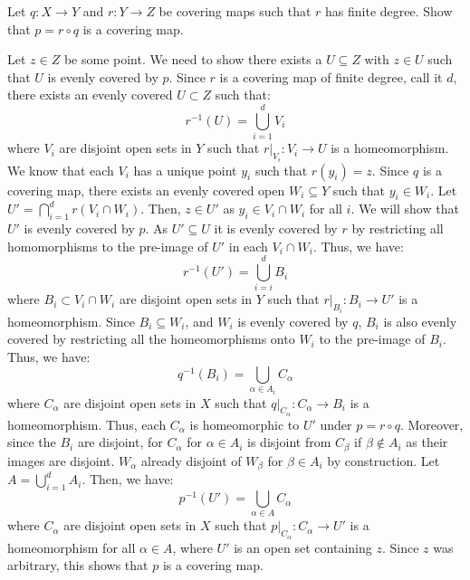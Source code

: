 \documentclass[12pt]{article}
\begin{document}
\begin{problem}{6}
Let \( q : X \to Y \) and \( r : Y \to Z \) be covering maps such that \( r \) has finite degree. Show that \( p = r \circ q \) is a covering map.
\end{problem}
\begin{solution}
    Let $z \in Z$ be some point. We need to show there exists a $U \subseteq Z$ with $z \in U$ such that $U$ is evenly covered by $p$. Since $r$ is a covering map of finite degree, call it $d$, there exists an evenly covered $U \subset Z$ such that: 
    \[ r^{-1}(U) = \bigcup_{i = 1}^d V_i \]
    where $V_i$ are disjoint open sets in $Y$ such that $r|_{V_i}: V_i \to U$ is a homeomorphism. \bbni
    We know that each $V_i$ has a unique point $y_i$ such that $r(y_i) = z$. Since $q$ is a covering map, there exists an evenly covered open $W_i \subseteq Y$ such that $y_i \in W_i$. Let $U' = \bigcap_{i = 1}^d r(V_i \cap W_i)$. Then, $z \in U'$ as $y_i \in V_i \cap W_i$ for all $i$. We will show that $U'$ is evenly covered by $p$. \bbni
    As $U' \subseteq U$ it is evenly covered by $r$ by restricting all homomorphisms to the pre-image of $U'$ in each $V_i \cap W_i$. Thus, we have:
    \[r^{-1}(U') = \bigcup_{i = i}^d B_{i}\]
    where $B_i \subset V_i \cap W_i$ are disjoint open sets in $Y$ such that $r|_{B_i}: B_i \to U'$ is a homeomorphism. \bbni
    Since $B_i \subseteq W_i$, and $W_i$ is evenly covered by $q$, $B_i$ is also evenly covered by restricting all the homeomorphisms onto $W_i$ to the pre-image of $B_i$. Thus, we have:
    \[q^{-1}(B_i) = \bigcup_{\alpha \in A_i} C_{\alpha}\]
    where $C_{\alpha}$ are disjoint open sets in $X$ such that $q|_{C_{\alpha}}: C_{\alpha} \to B_i$ is a homeomorphism. Thus, each $C_\alpha$ is homeomorphic to $U'$ under $p = r \circ q$. \bbni  
    Moreover, since the $B_i$ are disjoint, for $C_\alpha$ for $\alpha \in A_i$ is disjoint from $C_\beta$ if $\beta \not \in A_i$ as their images are disjoint. $W_\alpha$ already disjoint of $W_\beta$ for $\beta \in A_i$ by construction. \bbni 
    Let $A = \bigcup_{i = 1}^d A_i$. Then, we have:
    \[p^{-1}(U') = \bigcup_{\alpha \in A} C_\alpha\]
    where $C_\alpha$ are disjoint open sets in $X$ such that $p|_{C_\alpha}: C_\alpha \to U'$ is a homeomorphism for all $\alpha \in A$, where $U'$ is an open set containing $z$. Since $z$ was arbitrary, this shows that $p$ is a covering map.
\end{solution}
\end{document}
